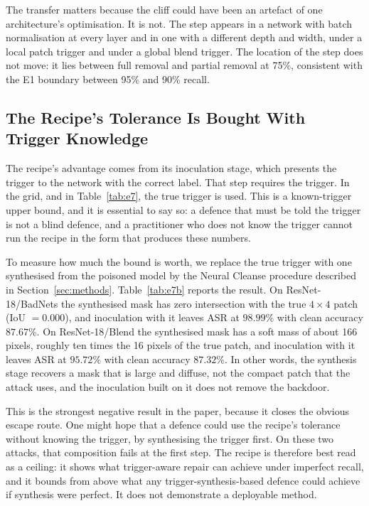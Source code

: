 The transfer matters because the cliff could have been an artefact of one
architecture's optimisation. It is not. The step appears in a network with batch
normalisation at every layer and in one with a different depth and width, under a
local patch trigger and under a global blend trigger. The location of the step
does not move: it lies between full removal and partial removal at 75\%,
consistent with the E1 boundary between 95\% and 90\% recall.



\subsection{The Recipe's Tolerance Is Bought With Trigger Knowledge}
The recipe's advantage comes from its inoculation stage, which presents the
trigger to the network with the correct label. That step requires the trigger. In
the grid, and in Table~\ref{tab:e7}, the true trigger is used. This is a
known-trigger upper bound, and it is essential to say so: a defence that must be
told the trigger is not a blind defence, and a practitioner who does not know the
trigger cannot run the recipe in the form that produces these numbers.

To measure how much the bound is worth, we replace the true trigger with one
synthesised from the poisoned model by the Neural Cleanse procedure described in
Section~\ref{sec:methods}. Table~\ref{tab:e7b} reports the result. On
ResNet-18/BadNets the synthesised mask has zero intersection with the true
$4\times4$ patch (IoU $=0.000$), and inoculation with it leaves ASR at
$98.99\%$ with clean accuracy $87.67\%$. On ResNet-18/Blend the synthesised mask
has a soft mass of about 166 pixels, roughly ten times the 16 pixels of the true
patch, and inoculation with it leaves ASR at $95.72\%$ with clean accuracy
$87.32\%$. In other words, the synthesis stage recovers a mask that is large and
diffuse, not the compact patch that the attack uses, and the inoculation built on
it does not remove the backdoor.

This is the strongest negative result in the paper, because it closes the obvious
escape route. One might hope that a defence could use the recipe's tolerance
without knowing the trigger, by synthesising the trigger first. On these two
attacks, that composition fails at the first step. The recipe is therefore best
read as a ceiling: it shows what trigger-aware repair can achieve under imperfect
recall, and it bounds from above what any trigger-synthesis-based defence could
achieve if synthesis were perfect. It does not demonstrate a deployable method.

